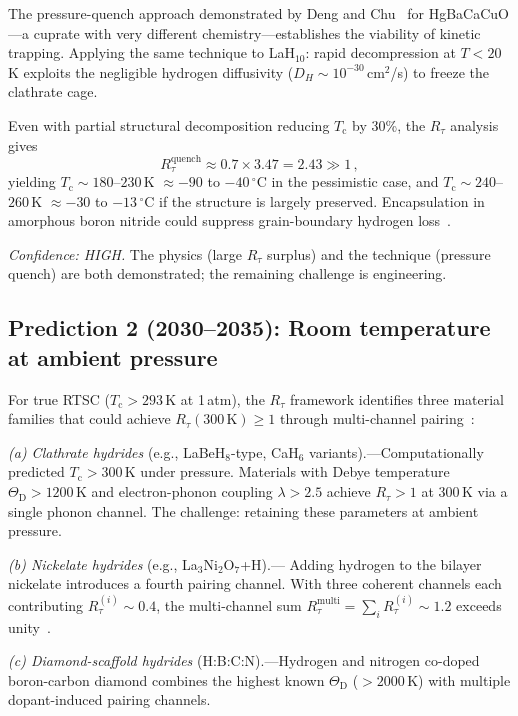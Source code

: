 \documentclass[prl,twocolumn,superscriptaddress,longbibliography,floatfix]{revtex4-2}
\newcommand{\tauasym}{\tau}
\newcommand{\Rtau}{R_{\tauasym}}
\newcommand{\Tc}{T_{\mathrm{c}}}
\newcommand{\ThetaD}{\Theta_{\mathrm{D}}}
\begin{document}
The pressure-quench approach demonstrated by Deng and
Chu~\cite{DengChu2026} for HgBaCaCuO---a cuprate with very
different chemistry---establishes the viability of kinetic
trapping.  Applying the same technique to LaH$_{10}$:
rapid decompression at $T < 20\,$K exploits the negligible
hydrogen diffusivity ($D_H \sim 10^{-30}\,$cm$^2$/s) to
freeze the clathrate cage.

Even with partial structural decomposition reducing $\Tc$ by
30\%, the $\Rtau$ analysis gives
\begin{equation}\label{eq:quench}
  \Rtau^{\mathrm{quench}} \approx 0.7 \times 3.47 = 2.43 \gg 1\,,
\end{equation}
yielding $\Tc \sim 180$--$230\,$K $\approx -90$ to
$-40\,^\circ$C in the pessimistic case, and
$\Tc \sim 240$--$260\,$K $\approx -30$ to $-13\,^\circ$C
if the structure is largely preserved.  Encapsulation in
amorphous boron nitride could suppress grain-boundary
hydrogen loss~\cite{HuangRTSC2026}.

\emph{Confidence: HIGH.}  The physics (large $\Rtau$ surplus)
and the technique (pressure quench) are both demonstrated;
the remaining challenge is engineering.

\subsection{Prediction 2 (2030--2035): Room temperature at ambient pressure}

For true RTSC ($\Tc > 293\,$K at 1\,atm), the $\Rtau$
framework identifies three material families that could
achieve $\Rtau(300\,\mathrm{K}) \geq 1$ through multi-channel
pairing~\cite{HuangRTSC2026}:

\emph{(a) Clathrate hydrides} (e.g., LaBeH$_8$-type, CaH$_6$
variants).---Computationally predicted $\Tc > 300\,$K under
pressure.  Materials with Debye temperature $\ThetaD > 1200\,$K
and electron-phonon coupling $\lambda > 2.5$ achieve
$\Rtau > 1$ at $300\,$K via a single phonon channel.  The
challenge: retaining these parameters at ambient pressure.

\emph{(b) Nickelate hydrides} (e.g., La$_3$Ni$_2$O$_7$+H).---
Adding hydrogen to the bilayer nickelate introduces a fourth
pairing channel.  With three coherent channels each contributing
$\Rtau^{(i)} \sim 0.4$, the multi-channel sum
$\Rtau^{\mathrm{multi}} = \sum_i \Rtau^{(i)} \sim 1.2$
exceeds unity~\cite{HuangRTSC2026}.

\emph{(c) Diamond-scaffold hydrides} (H:B:C:N).---Hydrogen
and nitrogen co-doped boron-carbon diamond combines the
highest known $\ThetaD$ ($> 2000\,$K) with multiple
dopant-induced pairing channels.
\end{document}
